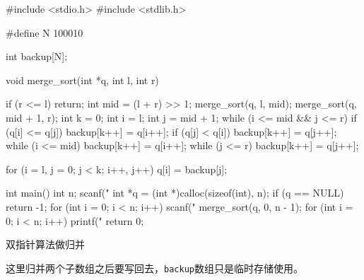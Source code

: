 \begin{mycpptwocol}
    #include <stdio.h>
    #include <stdlib.h>

    #define N 100010

    int backup[N];

    void merge_sort(int *q, int l, int r) {
        if (r <= l) {
            return;
        }
        int mid = (l + r) >> 1;
        merge_sort(q, l, mid);
        merge_sort(q, mid + 1, r);
        int k = 0;
        int i = l;
        int j = mid + 1;
        while (i <= mid && j <= r) {
            if (q[i] <= q[j]) {
                backup[k++] = q[i++];
            }
            if (q[j] < q[i]) {
                backup[k++] = q[j++];
            }
        }
        while (i <= mid) {
            backup[k++] = q[i++];
        }
        while (j <= r) {
            backup[k++] = q[j++];
        }

        for (i = l, j = 0; j < k; i++, j++) {
            q[i] = backup[j];
        }
    }

    int main() {
        int n;
        scanf("%
        int *q = (int *)calloc(sizeof(int), n);
        if (q == NULL) {
            return -1;
        }
        for (int i = 0; i < n; i++) {
            scanf("%
        }
        merge_sort(q, 0, n - 1);
        for (int i = 0; i < n; i++) {
            printf("%
        }
        return 0;
    }
\end{mycpptwocol}

双指针算法做归并

\begin{keypoint}
    这里归并两个子数组之后要写回去，\lstinline{backup}数组只是临时存储使用。
\end{keypoint}

